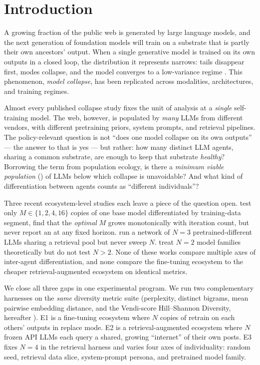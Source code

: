 \section{Introduction}
\label{sec:introduction}

A growing fraction of the public web is generated by large language
models, and the next generation of foundation models will train on a
substrate that is partly their own ancestors' output. When a single
generative model is trained on its own outputs in a closed loop, the
distribution it represents narrows: tails disappear first, modes
collapse, and the model converges to a low-variance regime
\citep{shumailov2024nature, alemohammad2023mad, dohmatob2024tale}. This
phenomenon, \emph{model collapse}, has been replicated across modalities,
architectures, and training regimes.

Almost every published collapse study fixes the unit of analysis at a
\emph{single} self-training model. The web, however, is populated by
\emph{many} LLMs from different vendors, with different pretraining
priors, system prompts, and retrieval pipelines. The policy-relevant
question is not ``does one model collapse on its own outputs'' --- the
answer to that is yes --- but rather: how many distinct LLM agents,
sharing a common substrate, are enough to keep that substrate
\emph{healthy}? Borrowing the term from population ecology, is there a
\emph{minimum viable population} (\mvp)
\citep{shaffer1981minimum} of LLMs below which collapse is unavoidable?
And what kind of differentiation between agents counts as ``different
individuals''?

Three recent ecosystem-level studies each leave a piece of the question
open. \citet{hodel2026epistemic} test only $M \in \{1, 2, 4, 16\}$
copies of one base model differentiated by training-data segment, find
that the \emph{optimal} $M$ grows monotonically with iteration count, but
never report an \mvp at any fixed horizon. \citet{wang2025web} run a
network of $N{=}3$ pretrained-different LLMs sharing a retrieval pool
but never sweep $N$. \citet{vu2025recursive} treat $N{=}2$ model families
theoretically but do not test $N{>}2$. None of these works compare
multiple axes of inter-agent differentiation, and none compare the
fine-tuning ecosystem to the cheaper retrieval-augmented ecosystem on
identical metrics.

We close all three gaps in one experimental program. We run two
complementary harnesses on the \emph{same} diversity metric suite
(perplexity, distinct bigrams, mean pairwise embedding distance, and
the Vendi-score Hill--Shannon Diversity, hereafter \hsd). E1 is a
fine-tuning ecosystem where $N$ copies of \distilgpt retrain on each
others' \wikitext outputs in replace mode. E2 is a retrieval-augmented
ecosystem where $N$ frozen API LLMs each query a shared, growing
``internet'' of their own posts. E3 fixes $N{=}4$ in the retrieval
harness and varies four axes of individuality: random seed, retrieval
data slice, system-prompt persona, and pretrained model family.

